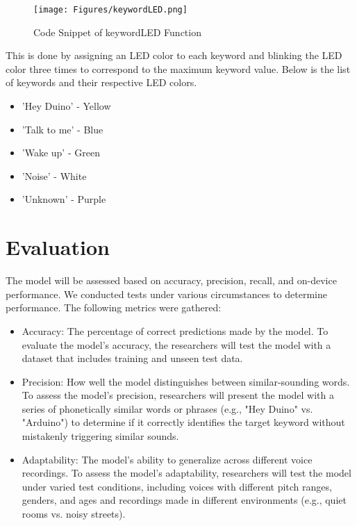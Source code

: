 \documentclass{article}
\begin{document}
\begin{enumerate}
  \begin{figure}[H]
        \centering
        \texttt{[image: Figures/keywordLED.png]}
        \caption{Code Snippet of keywordLED Function}
        \label{fig:ledKey}
  \end{figure}
  This is done by assigning an LED color to each keyword and blinking the LED color three times to correspond to the maximum keyword value. Below is the list of keywords and their respective LED colors.
  \begin{itemize}
      \item 'Hey Duino' - Yellow
      \item 'Talk to me' - Blue
      \item 'Wake up' - Green
      \item 'Noise' - White
      \item 'Unknown' - Purple
  \end{itemize}
    
\end{enumerate}

\section{Evaluation}
\label{sec:evaluation}

The model will be assessed based on accuracy, precision, recall, and on-device performance. We conducted tests under various circumstances to determine performance. The following metrics were gathered:

\begin{itemize}
    \item Accuracy: The percentage of correct predictions made by the model.  To evaluate the model's accuracy, the researchers will test the model with a dataset that includes training and unseen test data.
    \item Precision: How well the model distinguishes between similar-sounding words. To assess the model's precision, researchers will present the model with a series of phonetically similar words or phrases (e.g., "Hey Duino" vs. "Arduino") to determine if it correctly identifies the target keyword without mistakenly triggering similar sounds.
    \item Adaptability: The model's ability to generalize across different voice recordings. To assess the model's adaptability, researchers will test the model under varied test conditions, including voices with different pitch ranges, genders, and ages and recordings made in different environments (e.g., quiet rooms vs. noisy streets).
\end{itemize}
\end{document}
